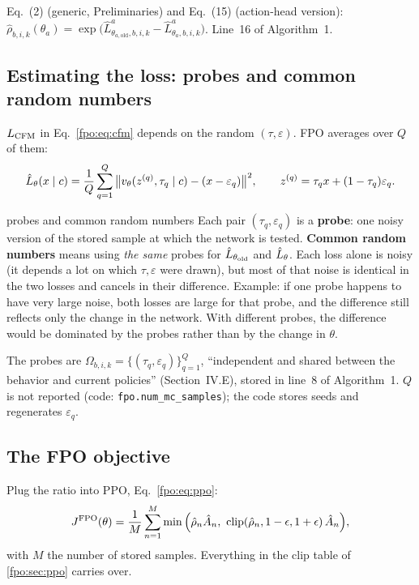 \begin{paperlink}
Eq.~(2) (generic, Preliminaries) and Eq.~(15) (action-head version): $\hat\rho_{b,i,k}(\theta_a)=\exp\big(\hat L^a_{\theta_{a,\mathrm{old}},b,i,k}-\hat L^a_{\theta_a,b,i,k}\big)$. Line~16 of Algorithm~1.
\end{paperlink}

\subsection{Estimating the loss: probes and common random numbers}
$L_{\mathrm{CFM}}$ in Eq.~\eqref{fpo:eq:cfm} depends on the random $(\tau,\varepsilon)$. FPO averages over $Q$ of them:
\begin{equation}
\hat L_\theta(x\mid c)=\frac1Q\sum_{q=1}^{Q}\big\|v_\theta(z^{(q)},\tau_q\mid c)-(x-\varepsilon_q)\big\|^2,\qquad z^{(q)}=\tau_q x+(1-\tau_q)\varepsilon_q .
\label{fpo:eq:lhat}
\end{equation}
\begin{newc}{probes and common random numbers}
Each pair $(\tau_q,\varepsilon_q)$ is a \textbf{probe}: one noisy version of the stored sample at which the network is tested. \textbf{Common random numbers} means using \emph{the same} probes for $\hat L_{\theta_{\mathrm{old}}}$ and $\hat L_\theta$. Each loss alone is noisy (it depends a lot on which $\tau,\varepsilon$ were drawn), but most of that noise is identical in the two losses and cancels in their difference. Example: if one probe happens to have very large noise, both losses are large for that probe, and the difference still reflects only the change in the network. With different probes, the difference would be dominated by the probes rather than by the change in $\theta$.
\end{newc}

\begin{paperlink}
The probes are $\Omega_{b,i,k}=\{(\tau_q,\varepsilon_q)\}_{q=1}^Q$, ``independent and shared between the behavior and current policies'' (Section~IV.E), stored in line~8 of Algorithm~1. $Q$ is not reported (code: \texttt{fpo.num\_mc\_samples}); the code stores seeds and regenerates $\varepsilon_q$.
\end{paperlink}

\subsection{The FPO objective}
Plug the ratio into PPO, Eq.~\eqref{fpo:eq:ppo}:
\begin{equation}
J^{\mathrm{FPO}}(\theta)=\frac1M\sum_{n=1}^{M}\min\Big(\hat\rho_n\Ah_n,\ \clip(\hat\rho_n,1-\epsilon,1+\epsilon)\,\Ah_n\Big),
\label{fpo:eq:fpo}
\end{equation}
with $M$ the number of stored samples. Everything in the clip table of \cref{fpo:sec:ppo} carries over.

